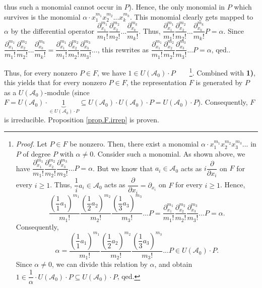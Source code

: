 \documentclass[etingof-lie.tex]{subfiles}
\begin{document}
\begin{vershort}
{thus such a monomial cannot occur in $P$). Hence, the only monomial in $P$
which survives is the monomial $\alpha\cdot x_{1}^{m_{1}}x_{2}^{m_{2}}%
...x_{k}^{m_{k}}$. This monomial clearly gets mapped to $\alpha$ by the
differential operator $\dfrac{\partial_{x_{1}}^{m_{1}}}{m_{1}!}\dfrac
{\partial_{x_{2}}^{m_{2}}}{m_{2}!}...\dfrac{\partial_{x_{k}}^{m_{k}}}{m_{k}!}%
$. Thus, $\dfrac{\partial_{x_{1}}^{m_{1}}}{m_{1}!}\dfrac{\partial_{x_{2}%
}^{m_{2}}}{m_{2}!}...\dfrac{\partial_{x_{k}}^{m_{k}}}{m_{k}!}P=\alpha$. Since
$\dfrac{\partial_{x_{1}}^{m_{1}}}{m_{1}!}\dfrac{\partial_{x_{2}}^{m_{2}}%
}{m_{2}!}...\dfrac{\partial_{x_{k}}^{m_{k}}}{m_{k}!}=\dfrac{\partial_{x_{1}%
}^{m_{1}}}{m_{1}!}\dfrac{\partial_{x_{2}}^{m_{2}}}{m_{2}!}\dfrac
{\partial_{x_{3}}^{m_{3}}}{m_{3}!}...$, this rewrites as $\dfrac
{\partial_{x_{1}}^{m_{1}}}{m_{1}!}\dfrac{\partial_{x_{2}}^{m_{2}}}{m_{2}%
!}\dfrac{\partial_{x_{3}}^{m_{3}}}{m_{3}!}...P=\alpha$, qed.}.
\end{vershort}

Thus, for every nonzero $P\in F$, we have $1\in U\left(  \mathcal{A}%
_{0}\right)  \cdot P$\ \ \ \ \footnote{\textit{Proof.} Let $P\in F$ be
nonzero. Then, there exist a monomial $\alpha\cdot x_{1}^{m_{1}}x_{2}^{m_{2}%
}x_{3}^{m_{3}}...$ in $P$ of degree $P$ with $\alpha\neq0$. Consider such a
monomial. As shown above, we have $\dfrac{\partial_{x_{1}}^{m_{1}}}{m_{1}%
!}\dfrac{\partial_{x_{2}}^{m_{2}}}{m_{2}!}\dfrac{\partial_{x_{3}}^{m_{3}}%
}{m_{3}!}...P=\alpha$. But we know that $a_{i}\in\mathcal{A}_{0}$ acts as
$i\dfrac{\partial}{\partial x_{i}}$ on $F$ for every $i\geq1$. Thus,
$\dfrac{1}{i}a_{i}\in\mathcal{A}_{0}$ acts as $\dfrac{\partial}{\partial
x_{i}}=\partial_{x_{i}}$ on $F$ for every $i\geq1$. Hence,%
\[
\dfrac{\left(  \dfrac{1}{1}a_{1}\right)  ^{m_{1}}}{m_{1}!}\dfrac{\left(
\dfrac{1}{2}a_{2}\right)  ^{m_{2}}}{m_{2}!}\dfrac{\left(  \dfrac{1}{3}%
a_{3}\right)  ^{m_{3}}}{m_{3}!}...P=\dfrac{\partial_{x_{1}}^{m_{1}}}{m_{1}%
!}\dfrac{\partial_{x_{2}}^{m_{2}}}{m_{2}!}\dfrac{\partial_{x_{3}}^{m_{3}}%
}{m_{3}!}...P=\alpha.
\]
Consequently,%
\[
\alpha=\dfrac{\left(  \dfrac{1}{1}a_{1}\right)  ^{m_{1}}}{m_{1}!}%
\dfrac{\left(  \dfrac{1}{2}a_{2}\right)  ^{m_{2}}}{m_{2}!}\dfrac{\left(
\dfrac{1}{3}a_{3}\right)  ^{m_{3}}}{m_{3}!}...P\in U\left(  \mathcal{A}%
_{0}\right)  \cdot P.
\]
Since $\alpha\neq0$, we can divide this relation by $\alpha$, and obtain
$1\in\dfrac{1}{\alpha}\cdot U\left(  \mathcal{A}_{0}\right)  \cdot P\subseteq
U\left(  \mathcal{A}_{0}\right)  \cdot P$, qed.}. Combined with \textbf{1)},
this yields that for every nonzero $P\in F$, the representation $F$ is
generated by $P$ as a $U\left(  \mathcal{A}_{0}\right)  $-module (since
$F=U\left(  \mathcal{A}_{0}\right)  \cdot\underbrace{1}_{\in U\left(
\mathcal{A}_{0}\right)  \cdot P}\subseteq U\left(  \mathcal{A}_{0}\right)
\cdot U\left(  \mathcal{A}_{0}\right)  \cdot P=U\left(  \mathcal{A}%
_{0}\right)  \cdot P$). Consequently, $F$ is irreducible. Proposition
\ref{prop.F.irrep} is proven.
\end{document}
